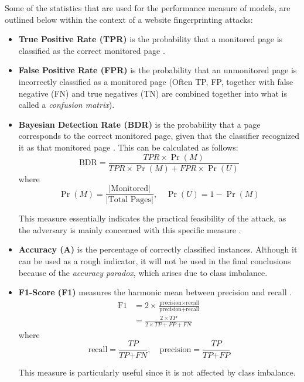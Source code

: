 Some of the statistics that are used for the performance measure of models, are outlined below within the context of a website fingerprinting attacks:
\begin{itemize}
  \item \textbf{True Positive Rate (TPR)} is the probability that a monitored page is classified as the correct monitored page \cite{kfingerprinting}.

  \item \textbf{False Positive Rate (FPR)} is the probability that an unmonitored page is incorrectly classified as a monitored page \cite{kfingerprinting}
    (Often TP, FP, together with false negative (FN) and true negatives (TN) are combined together into what is called a \textit{confusion matrix}).

  \item \textbf{Bayesian Detection Rate (BDR)} is the probability that a page corresponds to the correct monitored page, given that the classifier recognized it as that monitored page \cite{kfingerprinting}.
    This can be calculated as follows:
    $$\text{BDR} = \frac{\textit{TPR} \times \Pr(M)}{\textit{TPR} \times \Pr(M) + \textit{FPR} \times \Pr(U)}$$
    where
    $$\Pr(M) = \frac{|\text{Monitored}|}{|\text{Total Pages}|}, \quad \Pr(U) = 1 - \Pr(M)$$

    This measure essentially indicates the practical feasibility of the attack, as the adversary is mainly concerned with this specific measure \cite{kfingerprinting}.

  \item \textbf{Accuracy (A)} is the percentage of correctly classified instances.
    Although it can be used as a rough indicator, it will not be used in the final conclusions because of the \textit{accuracy paradox}, which arises due to class imbalance.

  \item \textbf{F1-Score (F1)} measures the harmonic mean between precision and recall \cite{scikitlearn}.
    \begin{align*}
      \text{F1} &= 2 \times \frac{\text{precision} \times \text{recall}}{\text{precision} + \text{recall}}\\
                &= \frac{2 \times \textit{TP}}{2 \times \textit{TP} + \textit{FP} + \textit{FN}}
    \end{align*}
    where
    $$\text{recall} = \frac{\textit{TP}}{\textit{TP} + \textit{FN}}, \quad \text{precision} = \frac{\textit{TP}}{\textit{TP} + \textit{FP}}$$

    This measure is particularly useful since it is not affected by class imbalance.
\end{itemize}

